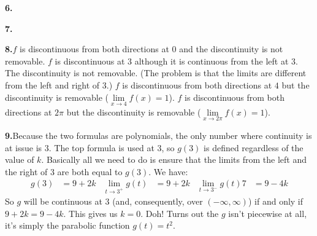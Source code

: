 \documentclass[10pt,oneside,]{book}
\theoremstyle{plain}
\theoremstyle{definition}
\numberwithin{equation}{section}
\newcommand{\fe}[2]{#1\mathopen{}\left(#2\right)\mathclose{}}
\newcommand{\ointerval}[2]{\left(#1,#2\right)}
\begin{document}
\par\smallskip
\noindent\textbf{6.}
\par\smallskip
\noindent\textbf{7.}
\par\smallskip
\noindent\textbf{8.}\quad{}\(f\) is discontinuous from both directions at \(0\) and the discontinuity is not removable. \(f\) is discontinuous at \(3\) although it is continuous from the left at \(3\).  The discontinuity is not removable.  (The problem is that the limits are different from the left and right of \(3\).) \(f\) is discontinuous from both directions at \(4\) but the discontinuity is removable (\(\lim\limits_{x\to4}\fe{f}{x}=1\)). \(f\) is discontinuous from both directions at \(2\pi\) but the discontinuity is removable (\(\lim\limits_{x\to2\pi}\fe{f}{x}=1\)).%
\par\smallskip
\noindent\textbf{9.}\quad{}Because the two formulas are polynomials, the only number where continuity is at issue is \(3\).  The top formula is used at \(3\), so \(\fe{g}{3}\) is defined regardless of the value of \(k\).  Basically all we need to do is ensure that the limits from the left and the right of \(3\) are both equal to \(\fe{g}{3}\).  We have: \begin{align*}
\fe{g}{3}&=9+2k&\lim_{t\to3^{+}}\fe{g}{t}&=9+2k&\lim_{t\to3^{-}}\fe{g}{t}7&=9-4k
\end{align*}So \(g\) will be continuous at \(3\) (and, consequently, over \(\ointerval{-\infty}{\infty}\)) if and only if \(9+2k=9-4k\).  This gives us \(k=0\).  Doh!  Turns out the \(g\) isn't piecewise at all, it's simply the parabolic function \(\fe{g}{t}=t^2\).%
\end{document}
